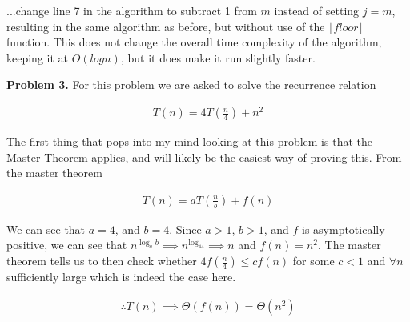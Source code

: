 \documentclass{article}
\begin{document}
...change line 7 in the algorithm to subtract 1 from $m$ instead of setting $j = m$, resulting in the same algorithm as before, but without use of the $\lfloor floor \rfloor$ function. This does not change the overall time complexity of the algorithm, keeping it at $O(logn)$, but it does make it run slightly faster. 

\hfill

\textbf{Problem 3.} For this problem we are asked to solve the recurrence relation

\begin{gather}
    T(n) = 4T(\frac{n}{4}) + n^2
\end{gather}

The first thing that pops into my mind looking at this problem is that the Master Theorem applies, and will likely be the easiest way of proving this. From the master theorem

\begin{gather}
    T(n) = aT(\frac{n}{b}) + f(n)
\end{gather}


We can see that $a = 4$, and $b = 4$. Since $a > 1$, $b > 1$, and $f$ is asymptotically positive, we can see that $n^{\log_ab} \implies n^{\log_44} \implies n$ and $f(n) = n^2$. The master theorem tells us to then check whether $4f(\frac{n}{4}) \leq cf(n)$ for some $c < 1$ and $\forall n$ sufficiently large which is indeed the case here.

\begin{gather}
    \therefore T(n) \implies \Theta(f(n)) = \Theta(n^2)
\end{gather}

\newpage
 

\end{document}
